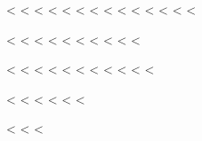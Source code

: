 <%
<%
<%
<%
<%
<%
<%
<%
<%
<%
<%
<%
<%
<%

<%
<%
<%
<%
<%
<%
<%
<%
<%
<%

<%
<%
<%
<%
<%
<%
<%
<%
<%
<%
<%

<%
<%
<%
<%
<%
<%

<%
<%
<%

